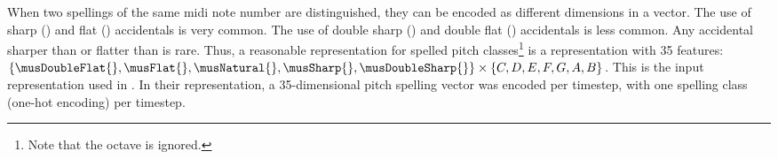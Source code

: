 
When two spellings of the same \gls{midi} note number are
distinguished, they can be encoded as different dimensions
in a vector. The use of sharp (\musSharp{}) and flat
(\musFlat{}) accidentals is very common. The use of double
sharp (\musDoubleSharp{}) and double flat (\musDoubleFlat{})
accidentals is less common. Any accidental sharper than
\musDoubleSharp{} or flatter than \musDoubleFlat{} is rare.
Thus, a reasonable representation for spelled pitch
classes\footnote{Note that the octave is ignored.} is a
representation with 35 features: $\{\musDoubleFlat{},
\musFlat{}, \musNatural{}, \musSharp{}, \musDoubleSharp{}\}
\times \{C, D, E, F, G, A, B\}$. This is the input
representation used in \textcite{micchi2020not,
micchi2021deep}. In their representation, a 35-dimensional
pitch spelling vector was encoded per timestep, with one
spelling class (one-hot encoding) per timestep.
